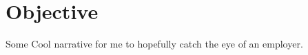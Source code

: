 \documentclass[../main.tex]{subfiles}
\begin{document}
\section{Objective}
Some Cool narrative for me to hopefully catch the eye of an employer. 
\end{document}
